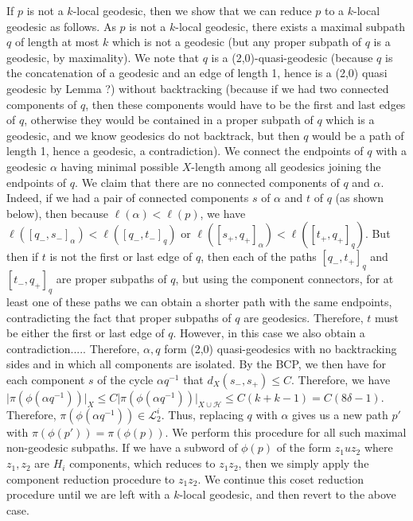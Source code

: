 \documentclass[12pt]{article}
\begin{document}
	If $p$ is not a $k$-local geodesic, then we show that we can reduce $p$ to a $k$-local geodesic as follows. As $p$ is not a $k$-local geodesic, there exists a maximal subpath $q$ of length at most $k$ which is not a geodesic (but any proper subpath of $q$ is a geodesic, by maximality). We note that $q$ is a (2,0)-quasi-geodesic (because $q$ is the concatenation of a geodesic and an edge of length 1, hence is a (2,0) quasi geodesic by Lemma ?) without backtracking (because if we had two connected components of $q$, then these components would have to be the first and last edges of $q$, otherwise they would be contained in a proper subpath of $q$ which is a geodesic, and we know geodesics do not backtrack, but then $q$ would be a path of length 1, hence a geodesic, a contradiction). We connect the endpoints of $q$ with a geodesic $\alpha$ having minimal possible $X$-length among all geodesics joining the endpoints of $q$. We claim that there are no connected components of $q$ and $\alpha$. Indeed, if we had a pair of connected components $s$ of $\alpha$ and $t$ of $q$ (as shown below), then because $\ell(\alpha) < \ell(p)$, we have $\ell([q_-, s_-]_{\alpha}) < \ell([q_-, t_-]_{q})$ or $\ell([s_+, q_+]_{\alpha}) < \ell([t_+, q_+]_q)$. But then if $t$ is not the first or last edge of $q$, then each of the paths $[q_-, t_+]_q$ and $[t_-, q_+]_q$ are proper subpaths of $q$, but using the component connectors, for at least one of these paths we can obtain a shorter path with the same endpoints, contradicting the fact that proper subpaths of $q$ are geodesics. Therefore, $t$ must be either the first or last edge of $q$. However, in this case we also obtain a contradiction..... Therefore, $\alpha, q$ form (2,0) quasi-geodesics with no backtracking sides and in which all components are isolated. By the BCP, we then have for each component $s$ of the cycle $\alpha q^{-1}$ that $d_X(s_-, s_+) \leq C$. Therefore, we have $\vert \pi(\phi(\alpha q^{-1})) \vert_X \leq C \vert \pi(\phi(\alpha q^{-1})) \vert_{X \cup \mathcal{H}} \leq C(k + k - 1) = C(8 \delta - 1)$. Therefore, $\pi(\phi(\alpha q^{-1})) \in \mathcal{L}_2^i$. Thus, replacing $q$ with $\alpha$ gives us a new path $p'$ with $\pi(\phi(p')) = \pi(\phi(p))$. We perform this procedure for all such maximal non-geodesic subpaths. If we have a subword of $\phi(p)$ of the form $z_1 u z_2$ where $z_1, z_2$ are $H_i$ components, which reduces to $z_1 z_2$, then we simply apply the component reduction procedure to $z_1 z_2$. We continue this coset reduction procedure until we are left with a $k$-local geodesic, and then revert to the above case. 
	
\end{document}
